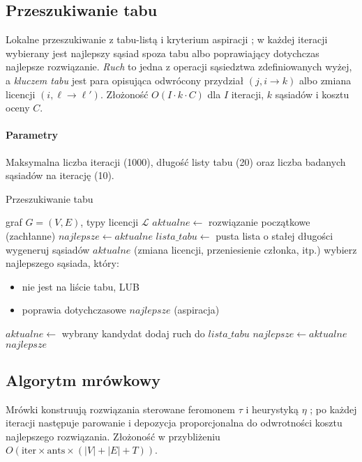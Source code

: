 \subsection{Przeszukiwanie tabu}\label{subsec:tabu}
Lokalne przeszukiwanie z tabu-listą i kryterium aspiracji \cite{glover1989}; w każdej iteracji wybierany jest najlepszy sąsiad spoza tabu albo poprawiający dotychczas najlepsze rozwiązanie. \emph{Ruch} to jedna z operacji sąsiedztwa zdefiniowanych wyżej, a \emph{kluczem tabu} jest para opisująca odwrócony przydział $(j, i\to k)$ albo zmiana licencji $(i,\ell\to\ell')$. Złożoność $O(I\cdot k\cdot C)$ dla \(I\) iteracji, \(k\) sąsiadów i kosztu oceny \(C\).

\paragraph{Parametry}
Maksymalna liczba iteracji (1000), długość listy tabu (20) oraz liczba badanych sąsiadów na iterację (10).

\begin{algorithm}[H]
\caption{Przeszukiwanie tabu}
\label{alg:tabu}
\begin{algorithmic}[1]
\Require graf $G=(V,E)$, typy licencji $\mathcal{L}$
\State $aktualne \gets$ rozwiązanie początkowe (zachłanne)
\State $najlepsze \gets aktualne$
\State $lista\_tabu \gets$ pusta lista o stałej długości
  \State wygeneruj sąsiadów $aktualne$ (zmiana licencji, przeniesienie członka, itp.)
  \State wybierz najlepszego sąsiada, który:
  \begin{itemize}[noitemsep]
    \item nie jest na liście tabu, LUB
    \item poprawia dotychczasowe $najlepsze$ (aspiracja)
  \end{itemize}
    \State $aktualne \gets$ wybrany kandydat
    \State dodaj ruch do $lista\_tabu$
      \State $najlepsze \gets aktualne$
    \EndIf
  \EndIf
\EndFor
\State \Return $najlepsze$
\end{algorithmic}
\end{algorithm}


\subsection{Algorytm mrówkowy}\label{subsec:aco}
Mrówki konstruują rozwiązania sterowane feromonem \(\tau\) i heurystyką \(\eta\) \cite{dorigo1997}; po każdej iteracji następuje parowanie i depozycja proporcjonalna do odwrotności kosztu najlepszego rozwiązania. Złożoność w przybliżeniu \(O(\text{iter}\times\text{ants}\times(|V|+|E|+T))\).

